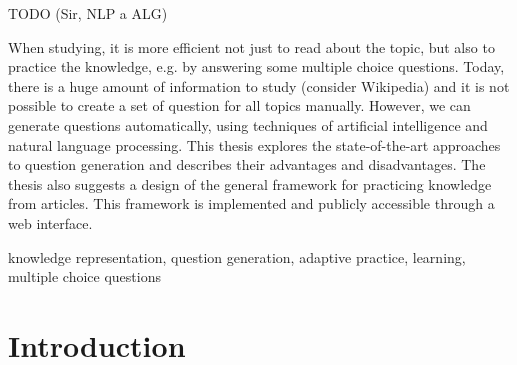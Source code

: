 \documentclass[a4paper, 12pt, twoside]{fithesis2}		%
\renewcommand{\_}{\leavevmode \kern0.0em\vbox{\hrule width0.4em}}
\newcounter{choice}
\begin{document}
\FrontMatter
\ThesisTitlePage

\begin{ThesisDeclaration}
\DeclarationText
\AdvisorName
\end{ThesisDeclaration}

\begin{ThesisThanks}

  TODO (Sir, NLP a ALG)


\end{ThesisThanks}

\begin{ThesisAbstract}
When studying, it is more efficient not just to read about the topic, but also to practice the knowledge, e.g. by answering some multiple choice questions. Today, there is a huge amount of information to study (consider Wikipedia) and it is not possible to create a set of question for all topics manually. However, we can generate questions automatically, using techniques of artificial intelligence and natural language processing. This thesis explores the state-of-the-art approaches to question generation and describes their advantages and disadvantages. The thesis also suggests a design of the general framework for practicing knowledge from articles. This framework is implemented and publicly accessible through a web interface.
\end{ThesisAbstract}

\begin{ThesisKeyWords}
knowledge representation, question generation, adaptive practice, learning,
multiple choice questions
\end{ThesisKeyWords}

\MainMatter
\tableofcontents

\chapter{Introduction}
\label{chap:intro}
\end{document}
